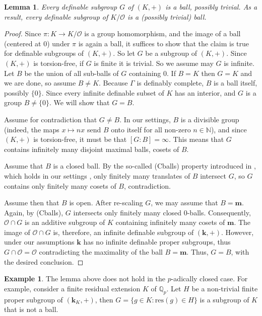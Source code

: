 \documentclass[11pt]{amsart}
\newtheorem{lemma}[theorem]{Lemma}
\theoremstyle{definition}
\newtheorem{example}[theorem]{Example}
\newcommand{\Nn}{{\mathbb{N}}}
\newcommand{\m}{\textbf{m}}
\newcommand{\bk}{\textbf{k}}
\newcommand{\CO}{{\mathcal O}}
\newcommand{\0}{\emptyset}
\begin{document}
\begin{lemma}\label{L:definable subgroup of K or K/O is a ball}
Every  definable subgroup $G$ of $(K,+)$ is a ball, possibly trivial.  As a result, every definable subgroup of $K/\CO$ is a (possibly trivial) ball.
\end{lemma}
\begin{proof}
    Since $\pi: K\to K/\CO$ is a group homomorphism, and the image of a ball (centered at $0$) under $\pi$ is again a ball, it suffices to show that the claim is true for definable subgroups of $(K,+)$.  So let $G$ be a subgroup of $(K,+)$.
   Since $(K,+)$ is torsion-free, if $G$ is finite it is trivial. So we assume may $G$ is infinite.
    Let $B$ be the union of all sub-balls of $G$ containing $0$. If $B=K$ then $G=K$ and we are done, so assume $B\neq K$. Because $\Gamma$ is definably complete, $B$ is a ball itself, possibly $\{0\}$.   Since every infinite definable subset of $K$ has an interior, and $G$ is a group $B\neq \{0\}$. We will show that $G=B$.

    
Assume for contradiction that $G\neq B$. In our settings,  $B$ is a divisible group (indeed, the maps $x\mapsto nx$ send $B$ onto itself for all non-zero $n\in \Nn$), and since $(K,+)$ is torsion-free, it must be that $[G:B]=\infty$. This means that $G$ contains infinitely many disjoint maximal balls, cosets of $B$.

Assume that $B$ is a closed ball. By the so-called (Cballs) property introduced in \cite{HaHaPeVF}, which holds in our settings \cite[Proposition 5.6, Lemma 5.10]{HaHaPeVF}, only finitely many translates of $B$ intersect $G$, so $G$ contains only finitely many cosets of $B$, contradiction.

Assume then that $B$ is open. After re-scaling $G$, we may assume that $B=\m$. Again, by (Cballs), $G$ intersects only finitely many closed $0$-balls. Consequently, $\CO\cap G$ is an additive subgroup of $K$ containing infinitely many cosets of $\m$. The image of $\CO\cap G$ is, therefore, an infinite definable subgroup of $(\bk,+)$. However, under our assumptions $\bk$ has no infinite definable proper subgroups, thus  $G\cap \CO=\CO$ contradicting the maximality of the ball $B=\m$. Thus, $G=B$, with the desired conclusion. 
\end{proof}

\begin{example}\label{E:counter to K/O p-adic}
    The lemma above does not hold in the $p$-adically closed case. For example, consider a finite residual extension $K$ of $\mathbb{Q}_p$. Let $H$ be a non-trivial finite proper subgroup of $(\bk_K,+)$, then $G=\{g\in K:\mathrm{res}(g)\in H\}$ is a  subgroup of $K$ that is not a ball.
\end{example}
\end{document}
